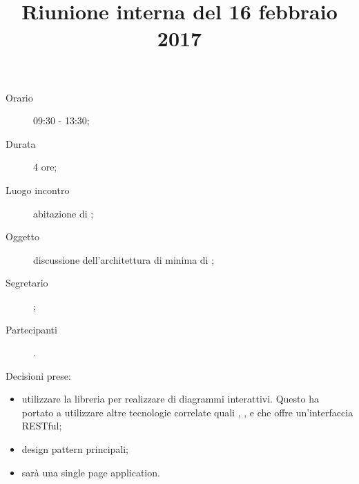 


\author{\LS}
\supervisor{\LB}
\title{Riunione interna del 16 febbraio 2017}



\maketitle

\begin{description}
	\item[Orario] 09:30 - 13:30;
	\item[Durata] 4 ore;
	\item[Luogo incontro] abitazione di \LS;
	\item[Oggetto] discussione dell'architettura di minima di \proj{};
	\item[Segretario] \LS; 
	\item[Partecipanti] \ALL.
\end{description}
Decisioni prese:
\begin{itemize}
\item utilizzare la libreria \jointjs{} per realizzare  di diagrammi interattivi. Questo ha portato a utilizzare altre tecnologie correlate quali \html{}, \jquery{}, \lodash{} e \backbonejs{} che offre un'interfaccia RESTful;
\item design pattern principali;
\item \proj{} sarà una single page application.
\end{itemize}

